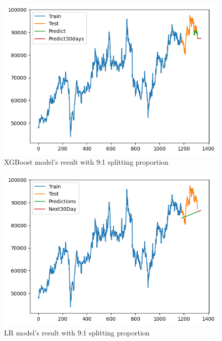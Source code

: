 \documentclass{ieeeojies}
\begin{document}
\begin{figure}[H]
  \centering
  \begin{minipage}{0.6\linewidth}
    \centering
    \includegraphics[width=\linewidth]{bibliography/diagram/XGBoost-VCB.png}
    \caption{XGBoost model’s result with 9:1 splitting proportion}
    \label{fig8}
  \end{minipage}
\end{figure}
\begin{figure}[H]
  \centering
  \begin{minipage}{0.6\linewidth}
    \centering
    \includegraphics[width=\linewidth]{bibliography/diagram/LR-VCB.png}
    \caption{LR model’s result with 9:1 splitting proportion}
    \label{fig8}
  \end{minipage}
\end{figure}
\end{document}
